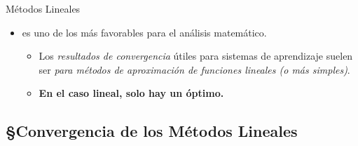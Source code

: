 \documentclass[10pt, envcountsect, handout, aspectratio=1610, hyperref={hypertexnames=true}]{beamer}
\begin{document}
\begin{frame}{Métodos Lineales}
\begin{itemize}
	\item {} es uno de los más favorables para el análisis matemático.
	\begin{itemize}
		\item Los \textit{resultados de convergencia} útiles para sistemas de aprendizaje suelen ser \textit{para métodos de aproximación de funciones lineales (o más simples)}.
		\item \textbf{En el caso lineal, solo hay un óptimo.}
	\end{itemize}
	\end{itemize}
	
\end{frame}



\subsection{\S Convergencia de los Métodos Lineales}
\end{document}
